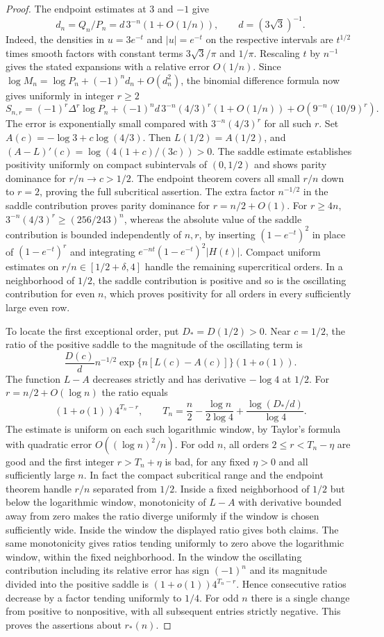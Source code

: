 \documentclass[11pt,a4paper]{article}
\begin{document}
\begin{proof}
The endpoint estimates at $3$ and $-1$ give
\[
 d_n=Q_n/P_n=d\,3^{-n}(1+O(1/n)),\qquad d=(3\sqrt3)^{-1}.
\]
Indeed, the densities in $u=3e^{-t}$ and $|u|=e^{-t}$ on the respective intervals are $t^{1/2}$ times smooth factors with constant terms $3\sqrt3/\pi$ and $1/\pi$. Rescaling $t$ by $n^{-1}$ gives the stated expansions with a relative error $O(1/n)$. Since $\log M_n=\log P_n+(-1)^nd_n+O(d_n^2)$, the binomial difference formula now gives uniformly in integer $r\ge2$
\[
 S_{n,r}=(-1)^r\Delta^r\log P_n
    +(-1)^n d\,3^{-n}(4/3)^r(1+O(1/n))
    +O(9^{-n}(10/9)^r).
\]
The error is exponentially small compared with $3^{-n}(4/3)^r$ for all such $r$. Set $A(c)=-\log3+c\log(4/3)$. Then $L(1/2)=A(1/2)$, and $(A-L)'(c)=\log(4(1+c)/(3c))>0$. The saddle estimate establishes positivity uniformly on compact subintervals of $(0,1/2)$ and shows parity dominance for $r/n\to c>1/2$. The endpoint theorem covers all small $r/n$ down to $r=2$, proving the full subcritical assertion. The extra factor $n^{-1/2}$ in the saddle contribution proves parity dominance for $r=n/2+O(1)$. For $r\ge4n$, $3^{-n}(4/3)^r\ge(256/243)^n$, whereas the absolute value of the saddle contribution is bounded independently of $n,r$, by inserting $(1-e^{-t})^2$ in place of $(1-e^{-t})^r$ and integrating $e^{-nt}(1-e^{-t})^2|H(t)|$. Compact uniform estimates on $r/n\in[1/2+\delta,4]$ handle the remaining supercritical orders. In a neighborhood of $1/2$, the saddle contribution is positive and so is the oscillating contribution for even $n$, which proves positivity for all orders in every sufficiently large even row.

To locate the first exceptional order, put $D_*=D(1/2)>0$. Near $c=1/2$, the ratio of the positive saddle to the magnitude of the oscillating term is
\[
 \frac{D(c)}d n^{-1/2}\exp\{n[L(c)-A(c)]\}(1+o(1)).
\]
The function $L-A$ decreases strictly and has derivative $-\log4$ at $1/2$. For $r=n/2+O(\log n)$ the ratio equals
\[
 (1+o(1))4^{T_n-r},\qquad
 T_n=\frac n2-\frac{\log n}{2\log4}+\frac{\log(D_*/d)}{\log4}.
\]
The estimate is uniform on each such logarithmic window, by Taylor's formula with quadratic error $O((\log n)^2/n)$. For odd $n$, all orders $2\le r<T_n-\eta$ are good and the first integer $r>T_n+\eta$ is bad, for any fixed $\eta>0$ and all sufficiently large $n$. In fact the compact subcritical range and the endpoint theorem handle $r/n$ separated from $1/2$. Inside a fixed neighborhood of $1/2$ but below the logarithmic window, monotonicity of $L-A$ with derivative bounded away from zero makes the ratio diverge uniformly if the window is chosen sufficiently wide. Inside the window the displayed ratio gives both claims. The same monotonicity gives ratios tending uniformly to zero above the logarithmic window, within the fixed neighborhood. In the window the oscillating contribution including its relative error has sign $(-1)^n$ and its magnitude divided into the positive saddle is $(1+o(1))4^{T_n-r}$. Hence consecutive ratios decrease by a factor tending uniformly to $1/4$. For odd $n$ there is a single change from positive to nonpositive, with all subsequent entries strictly negative. This proves the assertions about $r_*(n)$.\end{proof}
\end{document}
